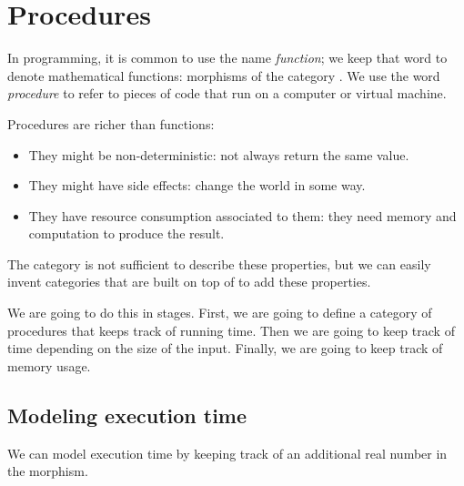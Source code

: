 
\section{Procedures}
\label{sec:procedures}

In programming, it is common to use the name \emph{function}; we keep that word to denote mathematical functions: morphisms of the category \Set.
We use the word \emph{procedure} to refer to pieces of code that run on a computer or virtual machine.

Procedures are richer than functions:
\begin{itemize}
    \item They might be non-deterministic: not always return the same value.
    \item They might have side effects: change the world in some way.
    \item They have resource consumption associated to them: they need memory and computation to produce the result.
\end{itemize}

The category \Set is not sufficient to describe these properties, but we can easily invent categories that are built on top of \Set to add these properties.

We are going to do this in stages.
First, we are going to define a category of procedures that keeps track of running time.
Then we are going to keep track of time depending on the size of the input.
Finally, we are going to keep track of memory usage.

\subsection{Modeling execution time}
\label{subsec:modeling-execution-time}
We can model execution time by keeping track of an additional real number in the morphism.

